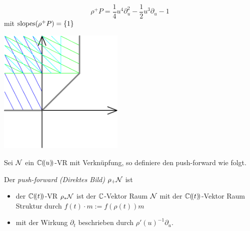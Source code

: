 \begin{exmp}
  \begin{minipage}[hbt]{0,39\textwidth}
    \[ \rho^+P= \frac{1}{4}u^4\partial_u^2 -\frac{1}{2}u^3\partial_u-1 \]
    mit $ \operatorname{slopes}(\rho^+P)=\{1\} $
  \end{minipage}
  \begin{minipage}[hbt]{0,59\textwidth}
    \begin{center}
      \includegraphics[width=6cm]{img/formal_b_pb.png}
    \end{center}
  \end{minipage}
\end{exmp}

Sei $\mathcal{N}$ ein $\mathbb{C}(\!(u)\!)$-VR mit Verknüpfung, so definiere den push-forward
wie folgt.
\begin{defn}
  \cite[1.a]{sabbah_Fourier-local}
  Der \emph{push-forward (Direktes Bild)} $\rho_+\mathcal{N}$ ist
  \begin{itemize}
    \item der $\mathbb{C}(\!(t)\!)$-VR $\rho_*\mathcal{N}$ ist der $\mathbb{C}$-Vektor Raum $\mathcal{N}$ mit
      der $\mathbb{C}(\!(t)\!)$-Vektor Raum Struktur durch $f(t)\cdot m:=f(\rho(t))m$
    \item mit der Wirkung $\partial_t$ beschrieben durch
      $\rho'(u)^{-1}\partial_u$.
  \end{itemize}
\end{defn}


